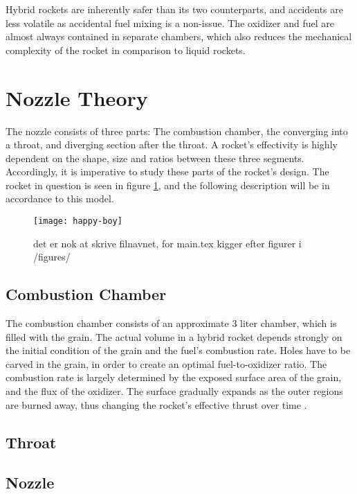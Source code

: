   Hybrid rockets are inherently safer than its two counterparts, and accidents are less volatile as accidental fuel mixing is a non-issue. The oxidizer and fuel are almost always contained in separate chambers, which also reduces the mechanical complexity of the rocket in comparison to liquid rockets.

\section{Nozzle Theory}

  The nozzle consists of three parts: The combustion chamber, the converging into a throat, and diverging section after the throat. A rocket's effectivity is highly dependent on the shape, size and ratios between these three segments. Accordingly, it is imperative to study these parts of the rocket's design.
  The rocket in question is seen in figure \ref{fig:rocketpic}, and the following description will be in accordance to this model.

  \begin{figure}
  \texttt{[image: happy-boy]}
  \caption{det er nok at skrive filnavnet, for main.tex kigger efter figurer i /figures/}
  \label{fig:rocketpic}
  \end{figure}

\subsection{Combustion Chamber}

  The combustion chamber consists of an approximate 3 liter chamber, which is filled with the grain. The actual volume in a hybrid rocket depends strongly on the initial condition of the grain and the fuel's combustion rate. Holes have to be carved in the grain, in order to create an optimal fuel-to-oxidizer ratio. The combustion rate is largely determined by the exposed surface area of the grain, and the flux of the oxidizer. The surface gradually expands as the outer regions are burned away, thus changing the rocket's effective thrust over time \cite[chapter 12, p.~174]{ignition}.

\subsection{Throat}
\subsection{Nozzle}
